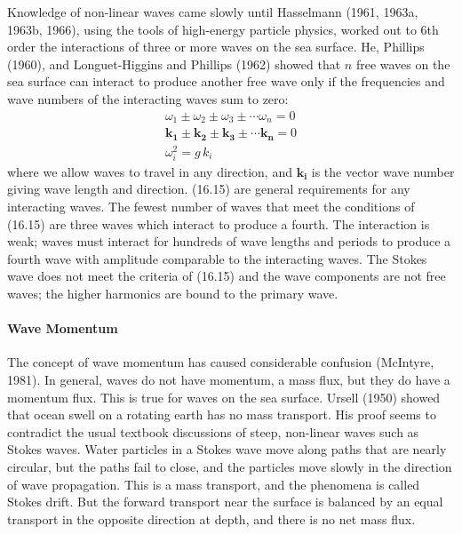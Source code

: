 Knowledge of non-linear waves came slowly until Hasselmann (1961, 1963a, 1963b,
1966), using the tools of high-energy particle physics, worked out to 6th order
the interactions of three or more waves on the sea surface. He, Phillips (1960),
and Longuet-Higgins and Phillips (1962) showed that $n$ free waves on the sea
surface can interact to produce another free wave only if the frequencies and wave
numbers of the interacting waves sum to zero:
\begin{subequations}
\begin{eqnarray}
 & \omega _{1} \pm \omega _{2} \pm \omega _{3} \pm \cdots \omega _{n}  = 0
& \\
 & \mathbf{k_{1}} \pm  \mathbf{k_{2}} \pm  \mathbf{k_{3}} \pm \cdots
\mathbf{k_{n}} =  0  &
\\
 & \omega_{i}^{2} = g \, k_{i} &
\end{eqnarray}
\end{subequations}
where we allow waves to travel in any direction, and $\mathbf{k_{i}}$ is the
vector wave number giving wave length and direction. (16.15) are general
requirements for any interacting waves. The fewest number of waves that meet the
conditions of (16.15) are three waves which interact to produce a fourth. The
interaction is weak; waves must interact for hundreds of wave lengths and periods
to produce a fourth wave with amplitude comparable to the interacting waves. The
Stokes wave does not meet the criteria of (16.15) and the wave components are
not free waves; the higher harmonics are bound to the primary wave.

\paragraph{Wave Momentum}
The concept of wave momentum has caused considerable confusion
(McIntyre, 1981). In general, waves do not have momentum, a mass flux, but they do
have a momentum flux. This is true for waves on the sea surface. Ursell (1950)
showed that ocean swell on a rotating earth has no mass transport.
His proof seems to contradict the usual textbook discussions of steep, non-linear waves such as
Stokes waves. Water particles in a Stokes wave move along paths that are
nearly circular, but the paths fail to close, and the particles move slowly in the
direction of wave propagation. This is a mass transport, and the phenomena is called
Stokes drift. But the forward transport near the surface is balanced by an equal
transport in the opposite direction at depth, and there is no net mass flux.

